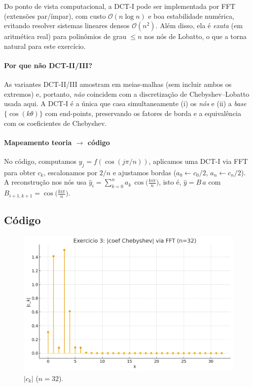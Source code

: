 \documentclass[11pt,a4paper]{article}
\begin{document}
Do ponto de vista computacional, a DCT-I pode ser implementada por FFT (extensões par/ímpar), com custo
$\mathcal{O}(n\log n)$ e boa estabilidade numérica, evitando resolver sistemas lineares densos $\mathcal{O}(n^2)$.
Além disso, ela é \emph{exata} (em aritmética real) para polinômios de grau $\le n$ nos nós de Lobatto, o que a torna
natural para este exercício.

\paragraph{Por que não DCT-II/III?}
As variantes DCT-II/III amostram em meias-malhas (sem incluir ambos os extremos) e, portanto, \emph{não} coincidem com
a discretização de Chebyshev–Lobatto usada aqui. A DCT-I é a única que casa simultaneamente (i) os \emph{nós} e (ii) a
\emph{base} $\{\cos(k\theta)\}$ com end-points, preservando os fatores de borda e a equivalência com os coeficientes de Chebyshev.

\paragraph{Mapeamento teoria $\to$ código}
No código, computamos $y_j=f(\cos(j\pi/n))$, aplicamos uma DCT-I via FFT para obter $c_k$, escalonamos por $2/n$ e
ajustamos bordas ($a_0\leftarrow c_0/2$, $a_n\leftarrow c_n/2$). A reconstrução nos nós usa
$\hat y_i=\sum_{k=0}^{n} a_k\,\cos\!\big(\tfrac{k i \pi}{n}\big)$, isto é, $\hat y=B\,a$ com $B_{i+1,k+1}=\cos\!\big(\tfrac{k i \pi}{n}\big)$.


\subsection*{Código}


\begin{figure}[h!]\centering
\includegraphics[width=0.7\linewidth]{figures/ex3_coeffs_n32.png}
\caption{$|c_k|$ ($n=32$).}
\label{fig:ex3_c32}
\end{figure}
\end{document}
